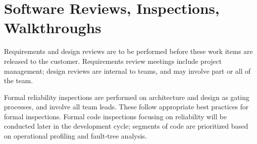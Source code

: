 \documentclass[11pt]{wacomepd}
\begin{document}
\chapter{Software Reviews, Inspections, Walkthroughs}

Requirements and design reviews are to be performed before these work items are released to the
customer.  Requirements review meetings include project management; design reviews are internal to
teams, and may involve part or all of the team.

Formal reliability inspections are performed on architecture and design as gating processes, and
involve all team leads.  These follow appropriate best practices for formal inspections.  Formal
code inspections focusing on reliability will be conducted later in the development cycle; segments
of code are prioritized based on operational profiling and fault-tree analysis.


\end{document}
